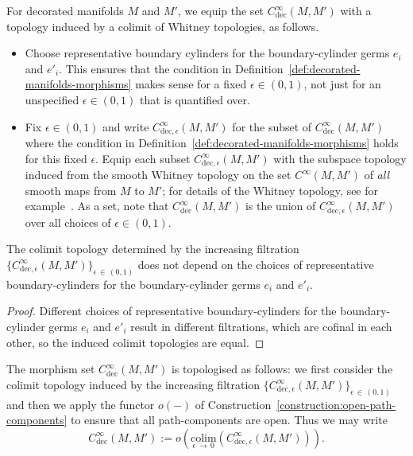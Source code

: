 \documentclass[AHL,Unicode,published]{cedram}
\newcommand{\colim}{\mathrm{colim}}
\newcommand{\rdec}{\mathrm{dec}}
\begin{document}
For decorated manifolds $M$ and $M'$, we equip the set $C^\infty_{\rdec}(M,M')$ with a topology induced by a colimit of Whitney topologies, as follows.
\begin{itemize}
\item Choose representative boundary cylinders for the boundary-cylinder germs $e_{i}$ and $e'_{i}$. This ensures that the condition in Definition~\ref{def:decorated-manifolds-morphisms} makes sense for a fixed $\epsilon \in (0,1)$, not just for an unspecified $\epsilon \in (0,1)$ that is quantified over.
\item Fix $\epsilon \in (0,1)$ and write $C^\infty_{\rdec,\epsilon}(M,M')$ for the subset of $C^\infty_{\rdec}(M,M')$ where the condition in Definition~\ref{def:decorated-manifolds-morphisms} holds for this fixed $\epsilon$. Equip each subset $C^\infty_{\rdec,\epsilon}(M,M')$ with the subspace topology induced from the smooth Whitney topology on the set $C^\infty(M,M')$ of \emph{all} smooth maps from $M$ to $M'$; for details of the Whitney topology, see for example~\cite[Chap.~2]{Hirsch1976Differentialtopology}. As a set, note that $C^\infty_{\rdec}(M,M')$ is the union of $C^\infty_{\rdec,\epsilon}(M,M')$ over all choices of $\epsilon \in (0,1)$.
\end{itemize}

\begin{lemm}\label{lem:topology_well_defined}
The colimit topology determined by the increasing filtration $\{ C^\infty_{\rdec,\epsilon}(M,M') \}_{\epsilon\,\in\,(0,1)}$ does not depend on the choices of representative boundary-cylinders for the boundary-cylinder germs $e_{i}$ and $e'_{i}$.
\end{lemm}

\begin{proof}
Different choices of representative boundary-cylinders for the boundary-cylinder germs $e_{i}$ and $e'_{i}$ result in different filtrations, which are cofinal in each other, so the induced colimit topologies are equal.
\end{proof}

\begin{defi}\label{def:decorated-manifolds-morphism-spaces}
The morphism set $C^\infty_{\rdec}(M,M')$ is topologised as follows: we first consider the colimit topology induced by the increasing filtration $\{ C^\infty_{\rdec,\epsilon}(M,M') \}_{\epsilon\,\in\,(0,1)}$ and then we apply the functor $o(-)$ of Construction~\ref{construction:open-path-components} to ensure that all path-components are open. Thus we may write
\[
C^\infty_{\rdec}(M,M') := o\left(\underset{\epsilon\,\to\,0}{\colim}(C^\infty_{\rdec,\epsilon}(M,M'))\right).
\]
\end{defi}
\end{document}

